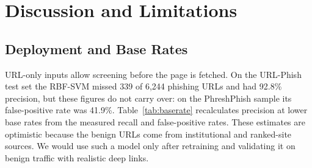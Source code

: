 \documentclass[conference]{IEEEtran}
\begin{document}
\begin{table}[htbp]
\centering
\caption{Fixed URL-Phish-Trained Pipelines: URL-Phish Test Set vs.\ PhreshPhish Sample (No Retraining)}
\label{tab:external}
\small
{}
\end{table}

\section{Discussion and Limitations}

\subsection{Deployment and Base Rates}
URL-only inputs allow screening before the page is fetched. On the URL-Phish test set the RBF-SVM missed 339 of 6{,}244 phishing URLs and had 92.8\% precision, but these figures do not carry over: on the PhreshPhish sample its false-positive rate was 41.9\%. Table~\ref{tab:baserate} recalculates precision at lower base rates from the measured recall and false-positive rates. These estimates are optimistic because the benign URLs come from institutional and ranked-site sources. We would use such a model only after retraining and validating it on benign traffic with realistic deep links.
\end{document}
